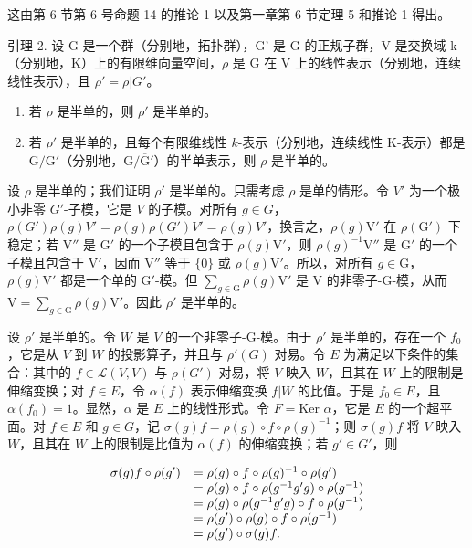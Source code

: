 这由第 6 节第 6 号命题 14 的推论 1 以及第一章第 6 节定理 5 和推论 1 得出。

引理 2. 设 G 是一个群（分别地，拓扑群），G' 是 G 的正规子群，V 是交换域 k（分别地，K）上的有限维向量空间，\(\rho\) 是 G 在 V 上的线性表示（分别地，连续线性表示），且 \(\rho' = \rho|G'\)。

\begin{enumerate}
\def\labelenumi{(\roman{enumi})}
\item
  若 \(\rho\) 是半单的，则 \(\rho'\) 是半单的。
\item
  若 \(\rho'\) 是半单的，且每个有限维线性 \(k\)-表示（分别地，连续线性 K-表示）都是 \(\mathrm{G} / \mathrm{G}'\)（分别地，\(\mathrm{G} / \overline{\mathrm{G}}'\)）的半单表示，则 \(\rho\) 是半单的。
\end{enumerate}

设 \(\rho\) 是半单的；我们证明 \(\rho'\) 是半单的。只需考虑 \(\rho\) 是单的情形。令 \(V'\) 为一个极小非零 \(G'\)-子模，它是 \(V\) 的子模。对所有 \(g \in G\)，\(\rho(G') \rho(g)V' = \rho(g)\rho(G')V' = \rho(g)V'\)，换言之，\(\rho(g)\mathrm{V}'\) 在 \(\rho(\mathrm{G}')\) 下稳定；若 \(\mathrm{V}''\) 是 \(\mathrm{G}'\) 的一个子模且包含于 \(\rho(g)\mathrm{V}'\)，则 \(\rho(g)^{-1}\mathrm{V}''\) 是 \(\mathrm{G}'\) 的一个子模且包含于 \(\mathrm{V}'\)，因而 \(\mathrm{V}''\) 等于 \(\{0\}\) 或 \(\rho(g)\mathrm{V}'\)。所以，对所有 \(g \in \mathrm{G}\)，\(\rho(g)\mathrm{V}'\) 都是一个单的 \(\mathrm{G}'\)-模。但 \(\sum_{g \in \mathrm{G}} \rho(g)\mathrm{V}'\) 是 \(\mathrm{V}\) 的非零子-G-模，从而 \(\mathrm{V} = \sum_{g \in \mathrm{G}} \rho(g)\mathrm{V}'\)。因此 \(\rho'\) 是半单的。

设 \(\rho'\) 是半单的。令 \(W\) 是 \(V\) 的一个非零子-G-模。由于 \(\rho'\) 是半单的，存在一个 \(f_0\)，它是从 \(V\) 到 \(W\) 的投影算子，并且与 \(\rho'(G)\) 对易。令 \(E\) 为满足以下条件的集合：其中的 \(f \in \mathcal{L}(V, V)\) 与 \(\rho(G')\) 对易，将 \(V\) 映入 \(W\)，且其在 \(W\) 上的限制是伸缩变换；对 \(f \in E\)，令 \(\alpha(f)\) 表示伸缩变换 \(f|W\) 的比值。于是 \(f_0 \in E\)，且 \(\alpha(f_0) = 1\)。显然，\(\alpha\) 是 \(E\) 上的线性形式。令 \(F = \text{Ker } \alpha\)，它是 \(E\) 的一个超平面。对 \(f \in E\) 和 \(g \in G\)，记 \(\sigma(g)f = \rho(g) \circ f \circ \rho(g)^{-1}\)；则 \(\sigma(g)f\) 将 \(V\) 映入 \(W\)，且其在 \(W\) 上的限制是比值为 \(\alpha(f)\) 的伸缩变换；若 \(g' \in G'\)，则

\[
\begin{array}{r l} \sigma (g) f \circ \rho (g ^ {\prime}) & = \rho (g) \circ f \circ \rho (g) ^ {- 1} \circ \rho (g ^ {\prime}) \\ & = \rho (g) \circ f \circ \rho (g ^ {- 1} g ^ {\prime} g) \circ \rho (g ^ {- 1}) \\ & = \rho (g) \circ \rho (g ^ {- 1} g ^ {\prime} g) \circ f \circ \rho (g ^ {- 1}) \\ & = \rho (g ^ {\prime}) \circ \rho (g) \circ f \circ \rho (g ^ {- 1}) \\ & = \rho (g ^ {\prime}) \circ \sigma (g) f. \end{array}
\]

